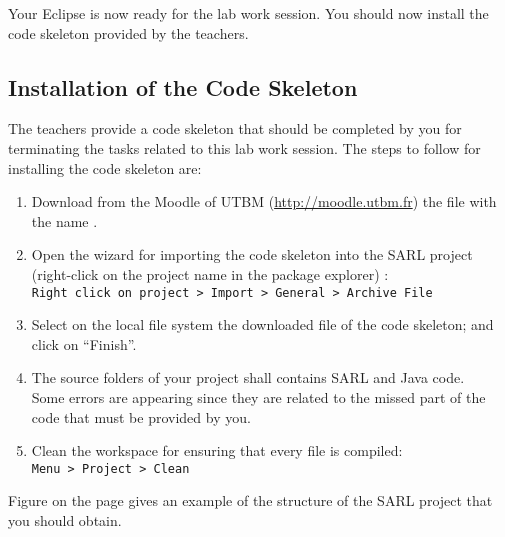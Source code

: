 Your Eclipse is now ready for the lab work session. You should now install the code skeleton provided by the teachers.

\subsection{Installation of the Code Skeleton}

The teachers provide a code skeleton that should be completed by you for terminating the tasks related to this lab work session.
The steps to follow for installing the code skeleton are:
\begin{enumerate}
\item Download from the Moodle of UTBM (\url{http://moodle.utbm.fr}) the file with the name \skeletonName.
\item Open the wizard for importing the code skeleton into the SARL project (right-click on the project name in the package explorer)	: \\
	\texttt{Right click on project > Import > General > Archive File}
\item Select on the local file system the downloaded file of the code skeleton; and click on ``Finish''.
\item The source folders of your project shall contains SARL and Java code. \\
	Some errors are appearing since they are related to the missed part of the code that must be provided by you. 
\item Clean the workspace for ensuring that every file is compiled: \\
	\texttt{Menu > Project > Clean}
\end{enumerate}

Figure  on the page  gives an example of the structure of the SARL project that you should obtain.


